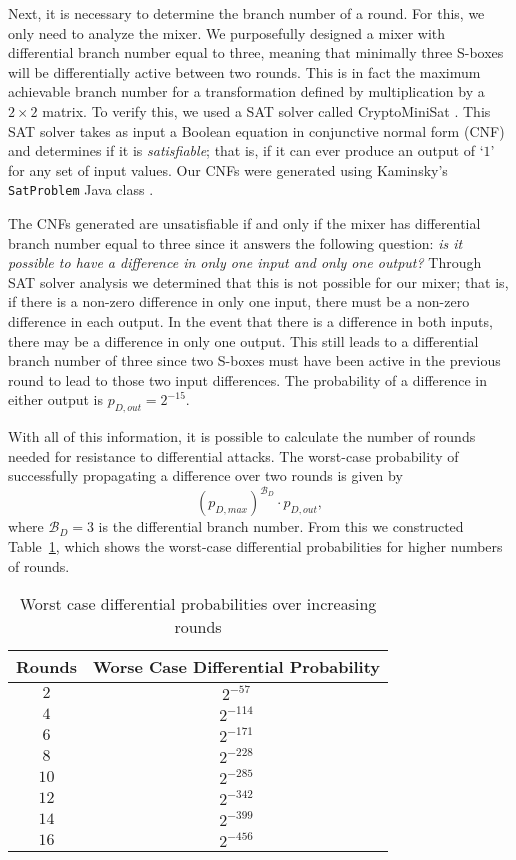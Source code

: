 Next, it is necessary to determine the branch number of a round.
For this, we only need to analyze the mixer. 
We purposefully designed a mixer with differential branch number equal to three, meaning that minimally three S-boxes will be differentially active between two rounds.
This is in fact the maximum achievable branch number for a transformation defined by multiplication by a $2 \times 2$ matrix.
To verify this, we used a SAT solver called CryptoMiniSat \cite{Soos2014_CryptoMiniSat}.
This SAT solver takes as input a Boolean equation in conjunctive normal form (CNF) and determines if it is \emph{satisfiable}; that is, if it can ever produce an output of `$1$' for any set of input values.
Our CNFs were generated using Kaminsky's \texttt{SatProblem} Java class \cite{Kaminsky2014_BlockCipherAnalysis}.

The CNFs generated are unsatisfiable if and only if the mixer has differential branch number equal to three since it answers the following question: \emph{is it possible to have a difference in only one input and only one output?}
Through SAT solver analysis we determined that this is not possible for our mixer; that is, if there is a non-zero difference in only one input, there must be a non-zero difference in each output.
In the event that there is a difference in both inputs, there may be a difference in only one output.
This still leads to a differential branch number of three since two S-boxes must have been active in the previous round to lead to those two input differences.
The probability of a difference in either output is $p_{D,out} = 2^{-15}$.

With all of this information, it is possible to calculate the number of rounds needed for resistance to differential attacks.
The worst-case probability of successfully propagating a difference over two rounds is given by
\begin{equation*}
(p_{D,max})^{\mathcal{B}_D} \cdot p_{D,out},
\end{equation*}
where $\mathcal{B}_D = 3$ is the differential branch number.
From this we constructed Table~\ref{tab:DifferentialProbabilities}, which shows the worst-case differential probabilities for higher numbers of rounds.
\begin{table}[ht]
\centering
\begin{tabular}{c|c}
Rounds & Worse Case Differential Probability \\
\hline
$2$  & $2^{-57}$  \\
$4$  & $2^{-114}$ \\
$6$  & $2^{-171}$ \\
$8$  & $2^{-228}$ \\
$10$ & $2^{-285}$ \\
$12$ & $2^{-342}$ \\
$14$ & $2^{-399}$ \\
$16$ & $2^{-456}$ \\
\end{tabular}
\caption{Worst case differential probabilities over increasing rounds}
\label{tab:DifferentialProbabilities}
\end{table}

